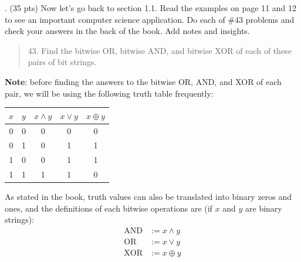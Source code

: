 \documentclass{article}
\newcommand{\sectionbreak}{\clearpage}
\begin{document}
\sectionbreak
6. (35 pts) Now let’s go back to section 1.1. Read the examples on page 11 and 12 to
see an important computer science application. Do each of \#43 problems and check your
answers in the back of the book. Add notes and insights.

\begin{quote}
    43. Find the bitwise OR, bitwise AND, and bitwise XOR of each of these pairs of bit strings.
\end{quote}
\textbf{Note}: before finding the answers to the bitwise OR, AND, and XOR of each pair, we will be using the following truth table frequently:

\bigbreak
\begin{tabular}{|c|c|c|c|c|}
    \hline
    $x$ & $y$ & $x \land y$ & $x \lor y$ & $x \oplus y$\\
    \hline
    0 & 0 & 0 & 0 & 0\\
    \hline
    0 & 1 & 0 & 1 & 1\\
    \hline
    1 & 0 & 0 & 1 & 1\\
    \hline
    1 & 1 & 1 & 1 & 0\\
    \hline
\end{tabular}

\bigbreak

As stated in the book, truth values can also be translated into binary zeros and ones, and the definitions of each bitwise operations are (if $x$ and $y$ are binary strings):
\begin{align*}
    \text{AND} &:= x \land y\\
    \text{OR} &:= x \lor y\\
    \text{XOR} &:= x \oplus y
\end{align*}
\end{document}
